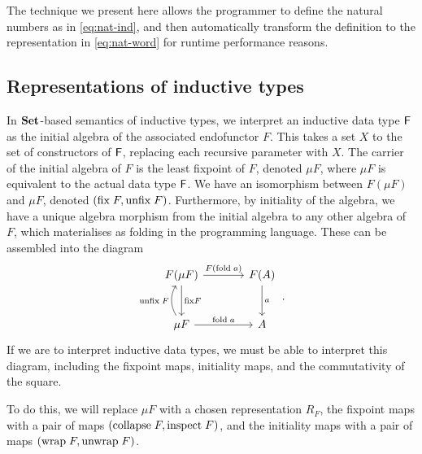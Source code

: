 The technique we present here allows the programmer to define the natural
numbers as in \eqref{eq:nat-ind}, and then automatically transform the
definition to the representation in \eqref{eq:nat-word} for runtime performance
reasons.

\subsection{Representations of inductive types}

In $\mathbf{Set}$-based semantics of inductive types, we interpret an inductive data
type $\textsf{F}$ as the initial algebra of the associated endofunctor $F$. This
takes a set $X$ to the set of constructors of $\textsf{F}$, replacing each
recursive parameter with $X$. The carrier of the initial algebra of $F$ is the
least fixpoint of $F$, denoted $\mu F$, where $\mu F$ is equivalent to the
actual data type $\textsf{F}$. We have an isomorphism between $F(\mu F)$ and
$\mu F$, denoted $(\text{fix}\;F, \text{unfix}\;F)$. Furthermore, by initiality
of the algebra, we have a unique algebra morphism from the initial algebra to
any other algebra of $F$, which materialises as folding in the programming
language. These can be assembled into the diagram
\begin{equation*}
  \begin{tikzcd}[column sep=large, row sep=large]
    F(\mu F) \ar[r, "F(\mta{fold}\;a)"] \ar[d, "\mta{fix} F"] & F(A) \ar[d, "a"] \\
    \mu F \ar[u, bend left, "\mta{unfix}\;F"] \ar[r, "\mta{fold}\;a"] & A
  \end{tikzcd} \,.
\end{equation*}
If we are to interpret inductive data types, we must be able to interpret
this diagram, including the fixpoint maps, initiality maps, and the commutativity
of the square.

To do this, we will replace $\mu F$ with a chosen representation $R_F$, the
fixpoint maps with a pair of maps $(\text{collapse}\;F, \text{inspect}\;F)$, and
the initiality maps with a pair of maps $(\text{wrap}\;F, \text{unwrap}\;F)$.

